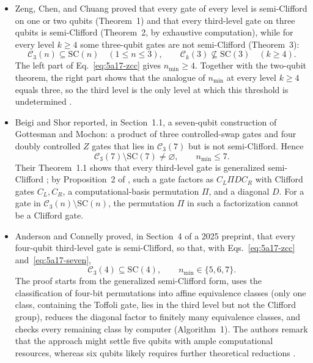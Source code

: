 \begin{itemize}
  \item Zeng, Chen, and Chuang proved that every gate of every level is
  semi-Clifford on one or two qubits (Theorem~1) and that every third-level gate
  on three qubits is semi-Clifford (Theorem~2, by exhaustive computation), while
  for every level $k\geq4$ some three-qubit gates are not semi-Clifford
  (Theorem~3):
  \begin{equation}
    \mathcal{C}_3(n)\subseteq\mathrm{SC}(n)\quad(1\leq n\leq3),
    \qquad
    \mathcal{C}_k(3)\not\subseteq\mathrm{SC}(3)\quad(k\geq4).
    \label{eq:5a17-zcc}
  \end{equation}
  The left part of Eq.~\eqref{eq:5a17-zcc} gives $n_{\min}\geq4$.  Together with
  the two-qubit theorem, the right part shows that the analogue of $n_{\min}$
  at every level $k\geq4$ equals three, so the third level is the only level at
  which this threshold is undetermined .

  \item Beigi and Shor reported, in Section~1.1, a seven-qubit construction of
  Gottesman and Mochon: a product of three controlled-swap gates and four doubly
  controlled $Z$ gates that lies in $\mathcal{C}_3(7)$ but is not semi-Clifford.
  Hence
  \begin{equation}
    \mathcal{C}_3(7)\setminus\mathrm{SC}(7)\neq\varnothing,
    \qquad
    n_{\min}\leq7.
    \label{eq:5a17-seven}
  \end{equation}
  Their Theorem~1.1 shows that every third-level gate is generalized
  semi-Clifford ; by Proposition~2 of
  , such a gate factors as $C_L\Pi DC_R$ with
  Clifford gates $C_L,C_R$, a computational-basis permutation $\Pi$, and a
  diagonal $D$.  For a gate in $\mathcal{C}_3(n)\setminus\mathrm{SC}(n)$, the
  permutation $\Pi$ in such a factorization cannot be a Clifford gate.

  \item Anderson and Connelly proved, in Section~4 of a 2025 preprint, that
  every four-qubit third-level gate is semi-Clifford, so that, with
  Eqs.~\eqref{eq:5a17-zcc} and~\eqref{eq:5a17-seven},
  \begin{equation}
    \mathcal{C}_3(4)\subseteq\mathrm{SC}(4),
    \qquad
    n_{\min}\in\{5,6,7\}.
    \label{eq:5a17-four}
  \end{equation}
  The proof starts from the generalized semi-Clifford form, uses the
  classification of four-bit permutations into affine equivalence classes (only
  one class, containing the Toffoli gate, lies in the third level but not the
  Clifford group), reduces the diagonal factor to finitely many equivalence
  classes, and checks every remaining class by computer (Algorithm~1).  The
  authors remark that the approach might settle five qubits with ample
  computational resources, whereas six qubits likely requires further
  theoretical reductions .


\end{itemize}
